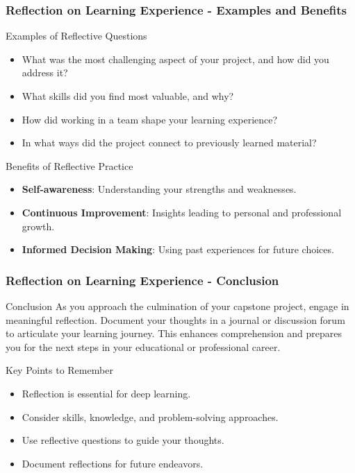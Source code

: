 \documentclass[aspectratio=169]{beamer}
\begin{document}
\begin{frame}[fragile]
    \frametitle{Reflection on Learning Experience - Examples and Benefits}
    \begin{block}{Examples of Reflective Questions}
        \begin{itemize}
            \item What was the most challenging aspect of your project, and how did you address it?
            \item What skills did you find most valuable, and why?
            \item How did working in a team shape your learning experience?
            \item In what ways did the project connect to previously learned material?
        \end{itemize}
    \end{block}

    \begin{block}{Benefits of Reflective Practice}
        \begin{itemize}
            \item \textbf{Self-awareness}: Understanding your strengths and weaknesses.
            \item \textbf{Continuous Improvement}: Insights leading to personal and professional growth.
            \item \textbf{Informed Decision Making}: Using past experiences for future choices.
        \end{itemize}
    \end{block}
\end{frame}

\begin{frame}[fragile]
    \frametitle{Reflection on Learning Experience - Conclusion}
    \begin{block}{Conclusion}
        As you approach the culmination of your capstone project, engage in meaningful reflection. Document your thoughts in a journal or discussion forum to articulate your learning journey. This enhances comprehension and prepares you for the next steps in your educational or professional career.
    \end{block}

    \begin{block}{Key Points to Remember}
        \begin{itemize}
            \item Reflection is essential for deep learning.
            \item Consider skills, knowledge, and problem-solving approaches.
            \item Use reflective questions to guide your thoughts.
            \item Document reflections for future endeavors.
        \end{itemize}
    \end{block}
\end{frame}
\end{document}
